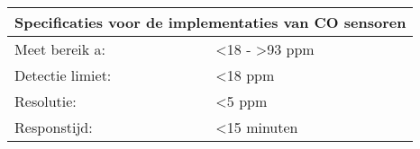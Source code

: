 \documentclass[a4paper, 11pt]{article} %
\begin{document}
\begin{center}
	\begin{tabular}{ | m{5cm} | m{5cm}| } 
		\hline
		\multicolumn{2}{|c|}{Specificaties voor de implementaties van CO sensoren} \\
		\hline
		Meet bereik a: & <18 - >93 ppm \\
		\hline
		Detectie limiet:  & <18 ppm
		\\ 
		\hline
		Resolutie: & <5 ppm 
		\\ 
		\hline
		Responstijd: & <15 minuten
		\\
		\hline
	\end{tabular}
\end{center}
\end{document}
